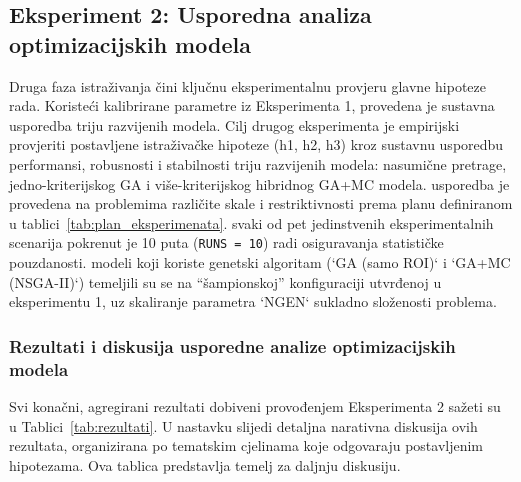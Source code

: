 \subsection{Eksperiment 2: Usporedna analiza optimizacijskih modela}
Druga faza istraživanja čini ključnu eksperimentalnu provjeru glavne hipoteze rada. Koristeći kalibrirane parametre iz Eksperimenta 1, provedena je sustavna usporedba triju razvijenih modela. Cilj drugog eksperimenta je empirijski provjeriti postavljene istraživačke hipoteze (h1, h2, h3) kroz sustavnu usporedbu performansi, robusnosti i stabilnosti triju razvijenih modela: nasumične pretrage, jedno-kriterijskog GA i više-kriterijskog hibridnog GA+MC modela. usporedba je provedena na problemima različite skale i restriktivnosti prema planu definiranom u tablici~\ref{tab:plan_eksperimenata}. svaki od pet jedinstvenih eksperimentalnih scenarija pokrenut je 10 puta (\texttt{RUNS = 10}) radi osiguravanja statističke pouzdanosti. modeli koji koriste genetski algoritam (`GA (samo ROI)` i `GA+MC (NSGA-II)`) temeljili su se na ``šampionskoj'' konfiguraciji utvrđenoj u eksperimentu 1, uz skaliranje parametra `NGEN` sukladno složenosti problema.

\begin{table}[H]
    \centering
    \caption{Plan naprednih eksperimenata.}
    \label{tab:plan_eksperimenata}
\end{table}

\subsubsection{Rezultati i diskusija usporedne analize optimizacijskih modela}
Svi konačni, agregirani rezultati dobiveni provođenjem Eksperimenta 2 sažeti su u Tablici~\ref{tab:rezultati}. U nastavku slijedi detaljna narativna diskusija ovih rezultata, organizirana po tematskim cjelinama koje odgovaraju postavljenim hipotezama. Ova tablica predstavlja temelj za daljnju diskusiju.

